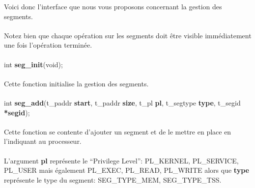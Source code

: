 \documentclass[10pt,a4wide]{article}
\begin{document}
Voici donc l'interface que nous vous proposons concernant la
gestion des segments.

\paragraph{}

Notez bien que chaque op\'eration sur les segments doit \^etre
visible imm\'ediatement une fois l'op\'eration termin\'ee.

\paragraph{}

\hspace{1.5cm}int \textbf{seg\_init}(void);

\paragraph{}

Cette fonction initialise la gestion des segments.

\paragraph{}

\hspace{1.5cm}int \textbf{seg\_add}(t\_paddr \textbf{start},
                                    t\_paddr \textbf{size},
                                    t\_pl \textbf{pl},
                                    t\_segtype \textbf{type},
                                    t\_segid \textbf{*segid});

\paragraph{}

Cette fonction se contente d'ajouter un segment et de le mettre en
place en l'indiquant au processeur.

\paragraph{}

L'argument \textbf{pl} repr\'esente le ``Privilege Level'': PL\_KERNEL,
PL\_SERVICE, PL\_USER mais \'egalement PL\_EXEC, PL\_READ, PL\_WRITE
alors que \textbf{type} repr\'esente le type du segment: SEG\_TYPE\_MEM,
SEG\_TYPE\_TSS.

\paragraph{}
\end{document}

